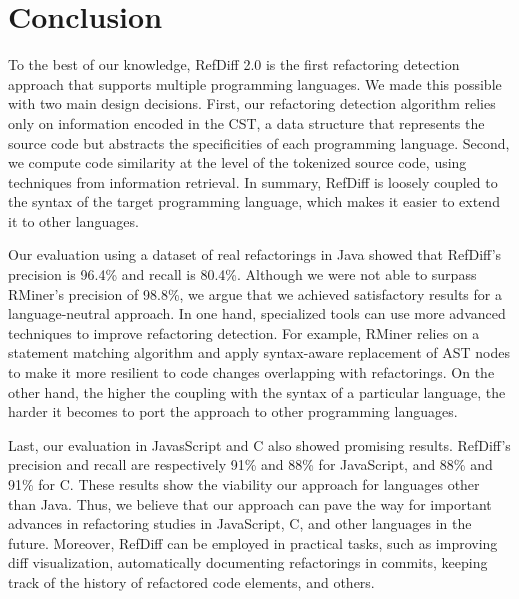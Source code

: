 \section{Conclusion}
\label{SecConclusion}



To the best of our knowledge, RefDiff 2.0 is the first refactoring detection approach that supports multiple programming languages.
We made this possible with two main design decisions. First, our refactoring detection algorithm relies only on information encoded in the CST, a data structure that represents the source code but abstracts the specificities of each programming language.
Second, we compute code similarity at the level of the tokenized source code, using techniques from information retrieval.
In summary, RefDiff is loosely coupled to the syntax of the target programming language, which makes it easier to extend it to other languages.

Our evaluation using a dataset of real refactorings in Java showed that RefDiff's precision is 96.4\% and recall is 80.4\%.
Although we were not able to surpass RMiner's precision of 98.8\%, we argue that we achieved satisfactory results for a language-neutral approach.
In one hand, specialized tools can use more advanced techniques to improve refactoring detection.
For example, RMiner relies on a statement matching algorithm and apply syntax-aware replacement of AST nodes to make it more resilient to code changes overlapping with refactorings.
On the other hand, the higher the coupling with the syntax of a particular language, the harder it becomes to port the approach to other programming languages.

Last, our evaluation in JavasScript and C also showed promising results. RefDiff's precision and recall are respectively 91\% and 88\% for JavaScript, and 88\% and 91\% for C.
These results show the viability our approach for languages other than Java.
Thus, we believe that our approach can pave the way for important advances in refactoring studies in JavaScript, C, and other languages in the future.
Moreover, RefDiff can be employed in practical tasks, such as improving diff visualization, automatically documenting refactorings in commits, keeping track of the history of refactored code elements, and others.
